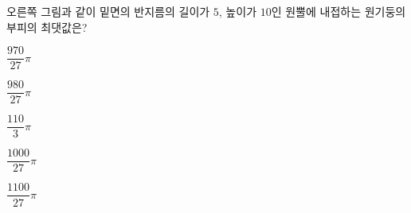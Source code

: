 \noindent\begin{minipage}[t]{0.58\linewidth}\vspace{0pt}\raggedright 오른쪽 그림과 같이 밑면의 반지름의 길이가 $5$, 높이가 $10$인 원뿔에 내접하는 원기둥의 부피의 최댓값은?\end{minipage}\hfill\begin{minipage}[t]{0.4\linewidth}\vspace{0pt}\centering \resizebox{\ifdim\width>\linewidth\linewidth\else\width\fi}{!}{}\end{minipage}\par
\begin{choicesii}{\rule[-3ex]{0pt}{8ex}$\dfrac{970}{27}\pi$}{\rule[-3ex]{0pt}{8ex}$\dfrac{980}{27}\pi$}{\rule[-3ex]{0pt}{8ex}$\dfrac{110}{3}\pi$}{\rule[-3ex]{0pt}{8ex}$\dfrac{1000}{27}\pi$}{\rule[-3ex]{0pt}{8ex}$\dfrac{1100}{27}\pi$}\end{choicesii}

